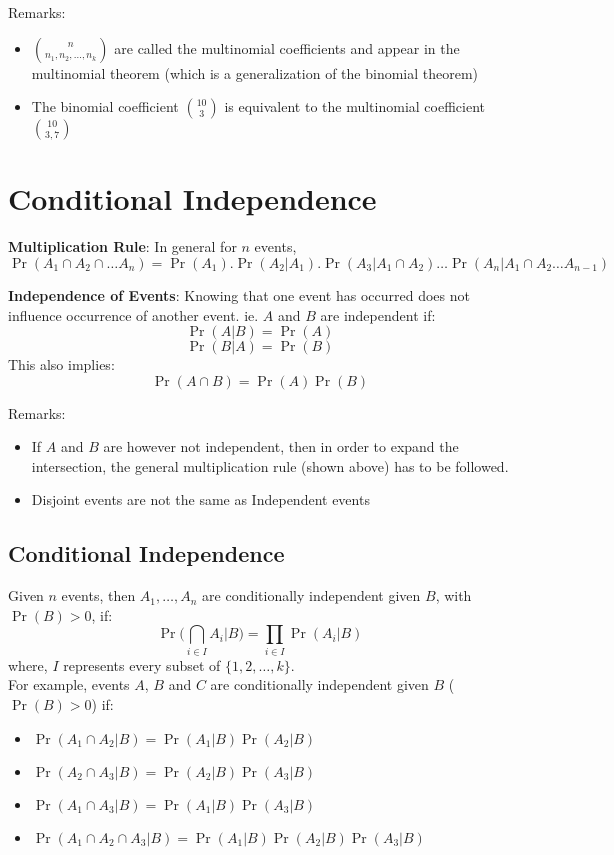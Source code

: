 \documentclass[english, 11pt]{article}
\begin{document}
Remarks:
\begin{itemize}
\item ${n \choose {n_1, n_2, \ldots, n_k}}$ are called the multinomial coefficients and appear in the multinomial theorem (which is a generalization of the binomial theorem)
\item The binomial coefficient ${10 \choose 3}$ is equivalent to the multinomial coefficient ${10 \choose {3, 7}}$ \\
\end{itemize}

\newpage

\section{Conditional Independence}
{\bf Multiplication Rule}: In general for $n$ events, 
\[ \Pr(A_1 \cap A_2 \cap \ldots A_n) = \Pr(A_1) . \Pr(A_2 | A_1) . \Pr(A_3 | {A_1 \cap A_2}) \ldots \Pr(A_n | {A_1 \cap A_2 \ldots A_{n-1}}) \]

{\bf Independence of Events}: Knowing that one event has occurred does not influence occurrence of another event. ie. $A$ and $B$ are independent if:
\[ \Pr(A|B) = \Pr(A) \]
\[ \Pr(B|A) = \Pr(B) \]
This also implies:
\[ \Pr(A \cap B) = \Pr(A) \Pr(B) \]

Remarks:
\begin{itemize}
\item If $A$ and $B$ are however not independent, then in order to expand the intersection, the general multiplication rule (shown above) has to be followed.
\item Disjoint events are not the same as Independent events
\end{itemize}

\subsection{Conditional Independence}
Given $n$ events, then $A_1, \ldots, A_n$ are conditionally independent given $B$, with $\Pr(B) > 0$, if:
\[ \Pr \bigg( \bigcap_{i \in I} A_i | B \bigg) = \prod_{i \in I} \Pr(A_i | B) \]
where, $I$ represents every subset of $\{ 1, 2, \ldots, k\}$. \\

For example, events $A$, $B$ and $C$ are conditionally independent given $B$ ($\Pr(B) > 0$) if:
\begin{itemize}
\item $\Pr(A_1 \cap A_2 | B) = \Pr(A_1 | B) \Pr(A_2 | B)$
\item $\Pr(A_2 \cap A_3 | B) = \Pr(A_2 | B) \Pr(A_3 | B)$
\item $\Pr(A_1 \cap A_3 | B) = \Pr(A_1 | B) \Pr(A_3 | B)$
\item $\Pr(A_1 \cap A_2 \cap A_3 | B) = \Pr(A_1 | B) \Pr(A_2 | B) \Pr(A_3 | B)$
\end{itemize}
\end{document}
